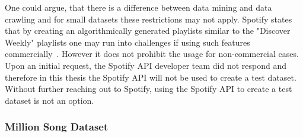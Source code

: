 One could argue, that there is a difference between data mining and data crawling and for small datasets these restrictions may not apply.
Spotify states that by creating an algorithmically generated playlists similar to the "Discover Weekly" playlists one may run into challenges if using such features commercially~\cite{spottac3}. However it does not prohibit the usage for non-commercial cases.\\ 
Upon an initial request, the Spotify API developer team did not respond and therefore in this thesis the Spotify API will not be used to create a test dataset. Without further reaching out to Spotify, using the Spotify API to create a test dataset is not an option. 

\subsubsection{Million Song Dataset}

